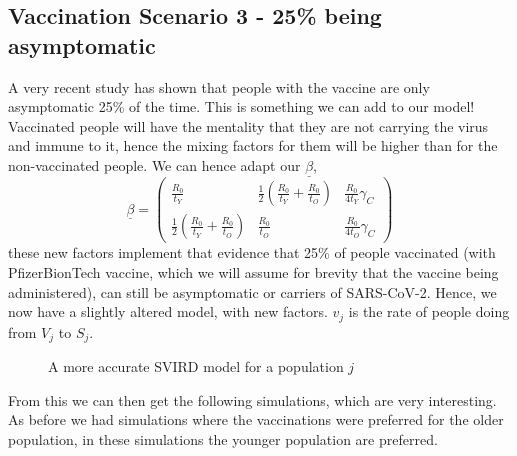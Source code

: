 \documentclass{article}
\begin{document}
\newpage
\subsection{Vaccination Scenario 3 - 25\% being asymptomatic}
A very recent study has shown that people with the vaccine are only asymptomatic 25\% of the time\cite{cit1}. This is something we can add to our model! Vaccinated people will have the mentality that they are not carrying the virus and immune to it, hence the mixing factors for them will be higher than for the non-vaccinated people. We can hence adapt our $\underline\beta$,
$$ \underline{\beta} = \begin{pmatrix} 
  \frac{R_0}{t_Y} & \frac{1}{2}\left ( \frac{R_0}{t_Y} + \frac{R_0}{t_O} \right ) & \frac{R_0}{4t_Y}\gamma_C\\
  \frac{1}{2}\left ( \frac{R_0}{t_Y} + \frac{R_0}{t_O} \right ) & \frac{R_0}{t_O} & \frac{R_0}{4t_O}\gamma_C
\end{pmatrix}
$$
these new factors implement that evidence that 25\% of people vaccinated (with PfizerBionTech vaccine, which we will assume for brevity that the vaccine being administered), can still be asymptomatic or carriers of SARS-CoV-2. Hence, we now have a slightly altered model, with new factors. $v_j$ is the rate of people doing from $V_j$ to $S_j$.

    \begin{figure}[!ht]
      \centering
      \caption{A more accurate SVIRD model for a population $j$}
      \label{fig:SVIRDrealLife}
    \end{figure}

\noindent
From this we can then get the following simulations, which are very interesting. As before we had simulations where the vaccinations were preferred for the older population, in these simulations the younger population are preferred. 
\end{document}
